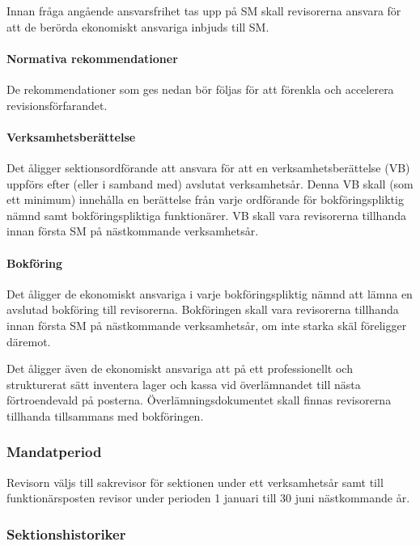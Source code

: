 \documentclass[a4paper,12pt]{article}
\begin{document}
Innan fråga angående ansvarsfrihet tas upp på SM skall revisorerna ansvara för att de berörda ekonomiskt ansvariga inbjuds till SM.

\paragraph{Normativa rekommendationer}

De rekommendationer som ges nedan bör följas för att förenkla och accelerera revisionsförfarandet.

\paragraph{Verksamhetsberättelse}

Det åligger sektionsordförande att ansvara för att en verksamhetsberättelse (VB) uppförs efter (eller i samband med) avslutat verksamhetsår. Denna VB skall (som ett minimum) innehålla en berättelse från varje ordförande för bokföringspliktig nämnd samt bokföringspliktiga funktionärer. VB skall vara revisorerna tillhanda innan första SM på nästkommande verksamhetsår.

\paragraph{Bokföring}

Det åligger de ekonomiskt ansvariga i varje bokföringspliktig nämnd att lämna en avslutad bokföring till revisorerna. Bokföringen skall vara revisorerna tillhanda innan första SM på nästkommande verksamhetsår, om inte starka skäl föreligger däremot.

Det åligger även de ekonomiskt ansvariga att på ett professionellt och strukturerat sätt inventera lager och kassa vid överlämnandet till nästa förtroendevald på posterna. Överlämningsdokumentet skall finnas revisorerna tillhanda tillsammans med bokföringen.

\subsubsection{Mandatperiod}

Revisorn väljs till sakrevisor för sektionen under ett verksamhetsår samt till funktionärsposten revisor under perioden 1 januari till 30 juni nästkommande år.

\subsubsection{Sektionshistoriker}
\end{document}
